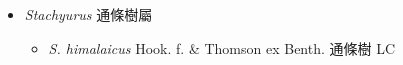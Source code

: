 
  \begin{itemize}
 \item[] \textit{Stachyurus} 通條樹屬
                                
  \begin{itemize}
        \item[] \textit{S. himalaicus} Hook. f. \& Thomson ex Benth.  通條樹   LC
  \end{itemize}
  \end{itemize}
